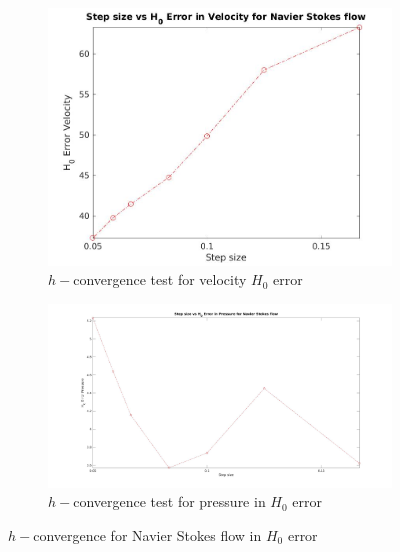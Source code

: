 \documentclass[a4paper,openany]{book}
\begin{document}
\begin{figure}
\begin{subfigure}{\textwidth}	
  \includegraphics[width=\linewidth]{H0_convergence_velocity_n_s.jpg}
  \caption{$h-$convergence test for velocity $H_0$ error}
  \label{fig:vel_navier_stoke_conv_h0}
\end{subfigure}
\begin{subfigure}{\textwidth}	
  \includegraphics[width=\linewidth]{H0_convergence_pressure_n_s.jpg}
  \caption{$h-$convergence test for pressure in $H_0$ error}
  \label{fig:pre_navier_stoke_conv_h0}
\end{subfigure}
\caption{$h-$convergence for Navier Stokes flow in $H_0$ error}
\label{navier_stoke_conv_h0}
\end{figure}
\end{document}
